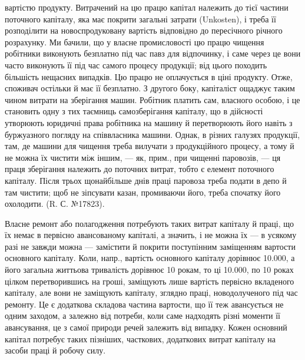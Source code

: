 \parcont{}  %
вартістю продукту. Витрачений на цю працю капітал належить до тієї частини поточного капіталу, яка
має покрити загальні затрати (Unkosten), і треба її розподілити на новоспродуковану вартість
відповідно до пересічного річного розрахунку. Ми бачили, що у власне промисловості цю працю чищення
робітники виконують безплатно під час павз для відпочинку, і саме через це вони часто виконують її
під час самого процесу продукції; від цього походить більшість нещасних випадків. Цю працю
не оплачується в ціні продукту. Отже, споживач остільки й має її безплатно. З другого боку,
капіталіст ощаджує таким чином витрати на зберігання машин. Робітник платить сам, власного особою, і
це становить одну з тих таємниць самозберігання капіталу, що в дійсності утворюють юридичні права
робітника на машину й перетворюють його навіть з буржуазного погляду на співвласника машини. Однак,
в різних галузях продукції, там, де машини для чищення треба вилучати з продукційного процесу, а
тому й не можна їх чистити між іншим, — як, прим., при чищенні паровозів, — ця праця зберігання
належить до поточних витрат, тобто є елемент поточного капіталу. Після трьох щонайбільше днів праці
паровоза треба подати в депо й там чистити; щоб не зіпсувати казан, промиваючи його, треба спочатку
його охолодити. (R. С. №\num{17823}).

Власне ремонт або полагодження потребують таких витрат капіталу й праці, що їх немає в первісно
авансованому капіталі, а значить, і не можна їх — в усякому разі не завжди можна — замістити й
покрити поступінним заміщенням вартости основного капіталу. Коли, напр., вартість основного капіталу
дорівнює \num{10.000}, а його загальна життьова тривалість дорівнює 10 рокам, то ці \num{10.000}, по 10 роках цілком перетворившись на гроші, заміщують лише вартість первісно вкладеного
капіталу, але вони не заміщують капіталу, зглядно праці, новодолученого під час ремонту. Це є
додаткова складова частина вартости, що її теж авансується не одним заходом, а залежно від потреби,
коли саме надходять різні моменти її авансування, це з самої природи речей залежить від випадку.
Кожен основний капітал потребує таких пізніших,
часткових, додаткових витрат капіталу на засоби праці й робочу силу.


